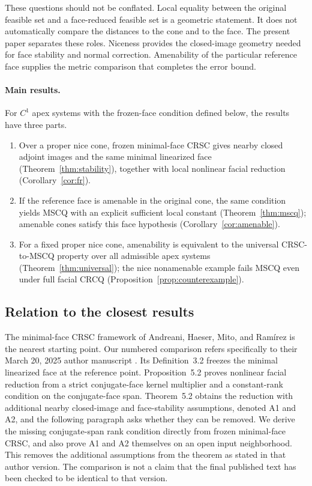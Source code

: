 \documentclass[11pt]{article}
\numberwithin{equation}{section}
\theoremstyle{definition}
\theoremstyle{remark}
\begin{document}
These questions should not be conflated. Local equality between the
original feasible set and a face-reduced feasible set is a geometric
statement. It does not automatically compare the distances to the cone
and to the face. The present paper separates these roles. Niceness
provides the closed-image geometry needed for face stability and normal
correction. Amenability of the particular reference face supplies the
metric comparison that completes the error bound.

\newpage
\paragraph{Main results.}
For $C^1$ apex systems with the frozen-face condition defined below,
the results have three parts.
\begin{enumerate}[label=\arabic*.]
\item Over a proper nice cone, frozen minimal-face CRSC gives nearby
closed adjoint images and the same minimal linearized face
(Theorem~\ref{thm:stability}), together with local nonlinear facial
reduction (Corollary~\ref{cor:fr}).
\item If the reference face is amenable in the original cone, the same
condition yields MSCQ with an explicit sufficient local constant
(Theorem~\ref{thm:mscq}); amenable cones satisfy this face hypothesis
(Corollary~\ref{cor:amenable}).
\item For a fixed proper nice cone, amenability is equivalent to the
universal CRSC-to-MSCQ property over all admissible apex systems
(Theorem~\ref{thm:universal}); the nice nonamenable example fails MSCQ
even under full facial CRCQ (Proposition~\ref{prop:counterexample}).
\end{enumerate}

\subsection{Relation to the closest results}

The minimal-face CRSC framework of Andreani, Haeser, Mito, and
Ram\'irez \citep{ahmr2026} is the nearest starting point. Our numbered
comparison refers specifically to their March 20, 2025 author manuscript
\citep{ahmr2025author}. Its Definition~3.2 freezes the minimal linearized
face at the reference point. Proposition~5.2 proves nonlinear facial
reduction from a strict conjugate-face kernel multiplier and a
constant-rank condition on the conjugate-face span. Theorem~5.2 obtains
the reduction with additional nearby closed-image and face-stability
assumptions, denoted A1 and A2, and the following paragraph asks whether
they can be removed. We derive the missing conjugate-span rank condition
directly from frozen minimal-face CRSC, and also prove A1 and A2
themselves on an open input neighborhood. This removes the additional
assumptions from the theorem as stated in that author version. The
comparison is not a claim that the final published text has been checked
to be identical to that version.
\end{document}
